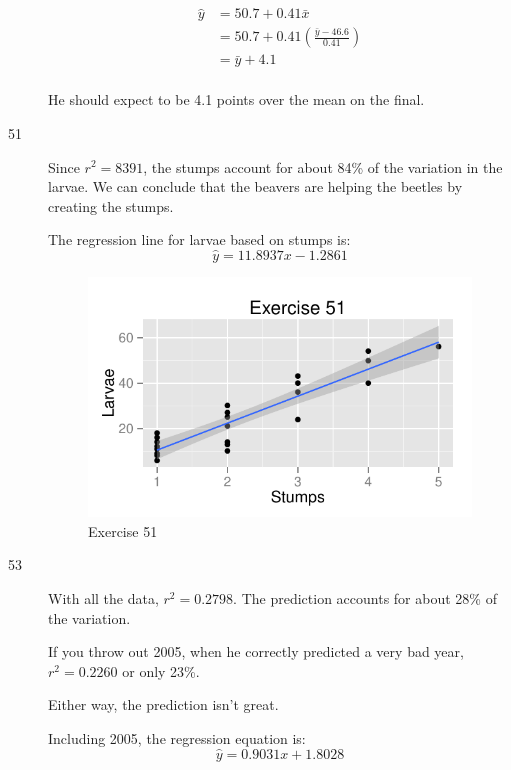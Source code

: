 \documentclass[letterpaper]{exam}
\begin{document}
\begin{description}
        \begin{align*}
          \hat{y} & = 50.7 + 0.41 \bar{x} \\
                  & = 50.7 + 0.41 \left( \frac{\bar{y} - 46.6}{0.41} \right) \\
                  & = \bar{y} + 4.1 \\
        \end{align*}

        He should expect to be 4.1 points over the mean on the final.

      \item[51]
        Since $r^2 = 8391$, the stumps account for about 84\% of the variation
        in the larvae.  We can conclude that the beavers are helping the beetles
        by creating the stumps.

        The regression line for larvae based on stumps is:
        \[
          \hat{y} = 11.8937 x - 1.2861 
        \]

        \begin{figure}[H]
          \centering
          \includegraphics{figures/ex51.pdf}
          \caption{Exercise 51}
        \end{figure}

      \item[53]
        With all the data, $r^2 = 0.2798$.  The prediction accounts for about
        28\% of the variation.  
        
        If you throw out 2005, when he correctly predicted a very bad year, 
        $r^2 = 0.2260$ or only 23\%.

        Either way, the prediction isn't great.

        Including 2005, the regression equation is:
        \[
          \hat{y} = 0.9031 x + 1.8028
        \]


\end{description}
\end{document}
